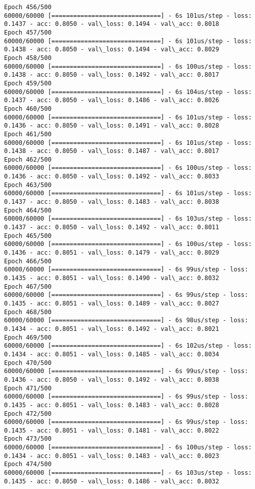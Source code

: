 \documentclass[11pt]{article}
\begin{document}
\begin{Verbatim}[commandchars=\\\{\}]
Epoch 456/500
60000/60000 [==============================] - 6s 101us/step - loss: 0.1437 - acc: 0.8050 - val\_loss: 0.1494 - val\_acc: 0.8018
Epoch 457/500
60000/60000 [==============================] - 6s 101us/step - loss: 0.1438 - acc: 0.8050 - val\_loss: 0.1494 - val\_acc: 0.8029
Epoch 458/500
60000/60000 [==============================] - 6s 100us/step - loss: 0.1438 - acc: 0.8050 - val\_loss: 0.1492 - val\_acc: 0.8017
Epoch 459/500
60000/60000 [==============================] - 6s 104us/step - loss: 0.1437 - acc: 0.8050 - val\_loss: 0.1486 - val\_acc: 0.8026
Epoch 460/500
60000/60000 [==============================] - 6s 101us/step - loss: 0.1436 - acc: 0.8050 - val\_loss: 0.1491 - val\_acc: 0.8028
Epoch 461/500
60000/60000 [==============================] - 6s 101us/step - loss: 0.1438 - acc: 0.8050 - val\_loss: 0.1487 - val\_acc: 0.8017
Epoch 462/500
60000/60000 [==============================] - 6s 100us/step - loss: 0.1436 - acc: 0.8050 - val\_loss: 0.1492 - val\_acc: 0.8033
Epoch 463/500
60000/60000 [==============================] - 6s 101us/step - loss: 0.1437 - acc: 0.8050 - val\_loss: 0.1483 - val\_acc: 0.8038
Epoch 464/500
60000/60000 [==============================] - 6s 103us/step - loss: 0.1437 - acc: 0.8050 - val\_loss: 0.1492 - val\_acc: 0.8011
Epoch 465/500
60000/60000 [==============================] - 6s 100us/step - loss: 0.1436 - acc: 0.8051 - val\_loss: 0.1479 - val\_acc: 0.8029
Epoch 466/500
60000/60000 [==============================] - 6s 99us/step - loss: 0.1435 - acc: 0.8051 - val\_loss: 0.1490 - val\_acc: 0.8032
Epoch 467/500
60000/60000 [==============================] - 6s 99us/step - loss: 0.1435 - acc: 0.8051 - val\_loss: 0.1489 - val\_acc: 0.8027
Epoch 468/500
60000/60000 [==============================] - 6s 98us/step - loss: 0.1434 - acc: 0.8051 - val\_loss: 0.1492 - val\_acc: 0.8021
Epoch 469/500
60000/60000 [==============================] - 6s 102us/step - loss: 0.1434 - acc: 0.8051 - val\_loss: 0.1485 - val\_acc: 0.8034
Epoch 470/500
60000/60000 [==============================] - 6s 99us/step - loss: 0.1436 - acc: 0.8050 - val\_loss: 0.1492 - val\_acc: 0.8038
Epoch 471/500
60000/60000 [==============================] - 6s 99us/step - loss: 0.1435 - acc: 0.8051 - val\_loss: 0.1483 - val\_acc: 0.8028
Epoch 472/500
60000/60000 [==============================] - 6s 99us/step - loss: 0.1435 - acc: 0.8051 - val\_loss: 0.1481 - val\_acc: 0.8022
Epoch 473/500
60000/60000 [==============================] - 6s 100us/step - loss: 0.1434 - acc: 0.8051 - val\_loss: 0.1483 - val\_acc: 0.8023
Epoch 474/500
60000/60000 [==============================] - 6s 103us/step - loss: 0.1435 - acc: 0.8050 - val\_loss: 0.1486 - val\_acc: 0.8032

\end{Verbatim}
\end{document}
